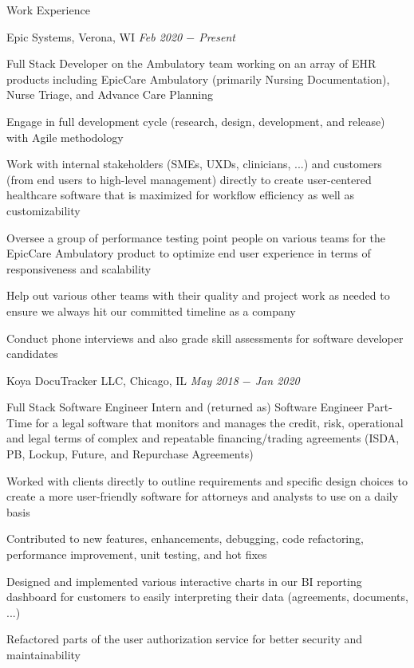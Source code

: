 \documentclass{resume}
\begin{document}
\begin{rSection}{Work Experience}

\begin{rSubsection}{Epic Systems, Verona, WI} {\textit{Feb 2020 $-$ Present}}
{}

    \item Full Stack Developer on the Ambulatory team working on an array of EHR products including EpicCare Ambulatory (primarily Nursing Documentation), Nurse Triage, and Advance Care Planning
    \item Engage in full development cycle (research, design, development, and release) with Agile methodology
    \item Work with internal stakeholders (SMEs, UXDs, clinicians, ...) and customers (from end users to high-level management) directly to create user-centered healthcare software that is maximized for workflow efficiency as well as customizability
    \item Oversee a group of performance testing point people on various teams for the EpicCare Ambulatory product to optimize end user experience in terms of responsiveness and scalability
    \item Help out various other teams with their quality and project work as needed to ensure we always hit our committed timeline as a company
    \item Conduct phone interviews and also grade skill assessments for software developer candidates

\end{rSubsection}

\begin{rSubsection}{Koya DocuTracker LLC, Chicago, IL} {\textit{May 2018 $-$ Jan 2020}}
{}

    \item Full Stack Software Engineer Intern and (returned as) Software Engineer Part-Time for a legal software that monitors and manages the credit, risk, operational and legal terms of complex and repeatable financing/trading agreements (ISDA, PB, Lockup, Future, and Repurchase Agreements)
    \item Worked with clients directly to outline requirements and specific design choices to create a more user-friendly software for attorneys and analysts to use on a daily basis
    \item Contributed to new features, enhancements, debugging, code refactoring, performance improvement, unit testing, and hot fixes
    \item Designed and implemented various interactive charts in our BI reporting dashboard for customers to easily interpreting their data (agreements, documents, ...)
    \item Refactored parts of the user authorization service for better security and maintainability


\end{rSubsection}
\end{rSection}
\end{document}
